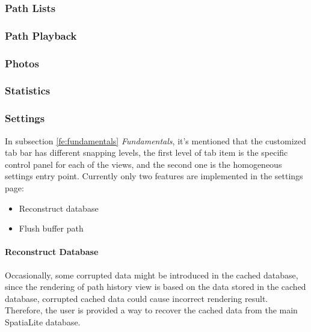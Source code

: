 \documentclass[12pt,a4paper]{article}
\begin{document}
            \subsubsection{Path Lists} %
            \subsubsection{Path Playback} %
            \subsubsection{Photos} %
            \subsubsection{Statistics} %
            
            \subsubsection{Settings} %
            \label{fe:settings}
            In subsection \ref{fe:fundamentals} \textit{Fundamentals}, it's mentioned that the customized tab bar has different snapping levels, the first level of tab item is the specific control panel for each of the views, and the second one is the homogeneous settings entry point. Currently only two features are implemented in the settings page:
            \begin{itemize}
                \setlength\itemsep{-0.5em}
                \item Reconstruct database
                \item Flush buffer path
            \end{itemize}
            \paragraph{Reconstruct Database}
            Occasionally, some corrupted data might be introduced in the cached database, since the rendering of path history view is based on the data stored in the cached database, corrupted cached data could cause incorrect rendering result. Therefore, the user is provided a way to recover the cached data from the main SpatiaLite database.
        
\end{document}
